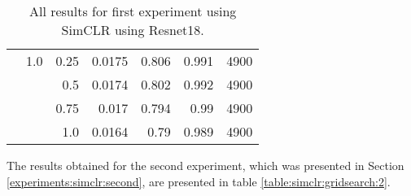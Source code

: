 \begin{table}[H]
{\begin{tabular}{rrrrrrr}
              & 1.0           & 0.25          & 0.0175               & 0.806                   & 0.991                   & 4900          \\
              &               & 0.5           & 0.0174               & 0.802                   & 0.992                   & 4900          \\
              &               & 0.75          & 0.017                & 0.794                   & 0.99                    & 4900          \\
              &               & 1.0           & 0.0164               & 0.79                    & 0.989                   & 4900         
\end{tabular}
}

\caption{All results for first experiment using SimCLR using Resnet18.}

\label{table:simclr:gridsearch:1}
\end{table}


The results obtained for the second experiment, which was presented in Section \ref{experiments:simclr:second}, are presented in table \ref{table:simclr:gridsearch:2}.


